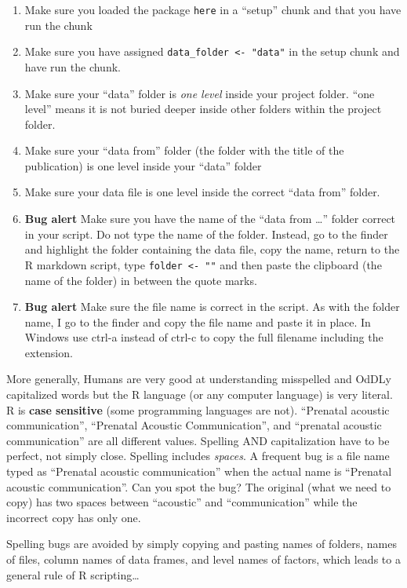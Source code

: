 \documentclass[]{book}
\providecommand{\tightlist}{%
  \setlength{\itemsep}{0pt}\setlength{\parskip}{0pt}}
\begin{document}
\begin{enumerate}
\def\labelenumi{\arabic{enumi}.}
\tightlist
\item
  Make sure you loaded the package \texttt{here} in a ``setup'' chunk and that you have run the chunk
\item
  Make sure you have assigned \texttt{data\_folder\ \textless{}-\ "data"} in the setup chunk and have run the chunk.
\item
  Make sure your ``data'' folder is \emph{one level} inside your project folder. ``one level'' means it is not buried deeper inside other folders within the project folder.
\item
  Make sure your ``data from'' folder (the folder with the title of the publication) is one level inside your ``data'' folder
\item
  Make sure your data file is one level inside the correct ``data from'' folder.
\item
  \textbf{Bug alert} Make sure you have the name of the ``data from \ldots{}'' folder correct in your script. Do not type the name of the folder. Instead, go to the finder and highlight the folder containing the data file, copy the name, return to the R markdown script, type \texttt{folder\ \textless{}-\ ""} and then paste the clipboard (the name of the folder) in between the quote marks.
\item
  \textbf{Bug alert} Make sure the file name is correct in the script. As with the folder name, I go to the finder and copy the file name and paste it in place. In Windows use ctrl-a instead of ctrl-c to copy the full filename including the extension.
\end{enumerate}

More generally, Humans are very good at understanding misspelled and OdDLy capitalized words but the R language (or any computer language) is very literal. R is \textbf{case sensitive} (some programming languages are not). ``Prenatal acoustic communication'', ``Prenatal Acoustic Communication'', and ``prenatal acoustic communication'' are all different values. Spelling AND capitalization have to be perfect, not simply close. Spelling includes \emph{spaces}. A frequent bug is a file name typed as ``Prenatal acoustic communication'' when the actual name is ``Prenatal acoustic communication''. Can you spot the bug? The original (what we need to copy) has two spaces between ``acoustic'' and ``communication'' while the incorrect copy has only one.

Spelling bugs are avoided by simply copying and pasting names of folders, names of files, column names of data frames, and level names of factors, which leads to a general rule of R scripting\ldots{}
\end{document}
